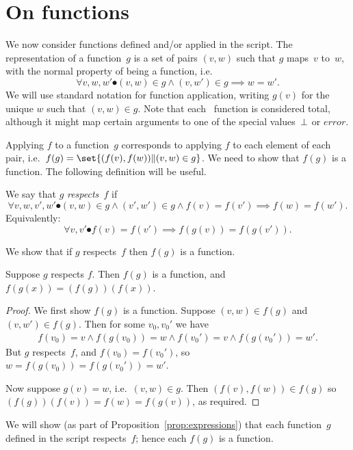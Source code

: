 \section{On functions}
\label{sec:functions}

We now consider functions defined and/or applied in the script.
The representation of a function~$g$ is a set of pairs $(v,w)$ such that $g$
maps~$v$ to~$w$, with the normal property of being a function, i.e.
\[
\forall v, w, w' \spot (v,w) \in g \land (v,w') \in g \implies w=w'.
\]
We will use standard notation for function application, writing $g(v)$ for the
unique $w$ such that $(v,w) \in g$.
%
Note that each \CSPm\ function is considered total, although it might map
certain arguments to one of the special values~$\perp$ or $error$. 

Applying $f$ to a function~$g$ corresponds to applying $f$ to each element of
each pair, i.e.~$f(g) = \set{(f(v), f(w)) \| (v,w) \in g}$.  We need to show
that $f(g)$ is a function. 
%
The following definition will be useful.
%
\begin{definition}
We say that $g$ \emph{respects~$f$} if
\[
\forall v, w, v', w' \spot 
  (v,w) \in g \land (v',w') \in g \land f(v) = f(v') \implies f(w) = f(w'). 
\]
Equivalently:
\[
\forall v,  v' \spot f(v) = f(v') \implies f(g(v)) = f(g(v')). 
\]
\end{definition}

We show that if $g$ respects~$f$ then $f(g)$ is a function.  
%
\begin{lemma}
\label{lem:function-respects}
Suppose $g$ respects $f$.  Then $f(g)$ is a function, and $f(g(x)) =
(f(g))(f(x))$.
\end{lemma}
%
\begin{proof}
We first show $f(g)$ is a function.  Suppose $(v,w) \in f(g)$ and $(v,w') \in
f(g)$.  Then for some $v_0, v_0'$ we have
\[
\begin{align}
f(v_0) = v \land f(g(v_0)) = w \land 
f(v_0') = v \land f(g(v_0')) = w'.
\end{align}
\]
But $g$ respects~$f$, and $f(v_0) = f(v_0')$, so $w = f(g(v_0)) = f(g(v_0')) =
w'$.

Now suppose $g(v) = w$, i.e.~$(v,w) \in g$.  Then $(f(v),f(w)) \in f(g)$ so
$(f(g))(f(v)) = f(w) = f(g(v))$, as required.
\end{proof}

We will show (as part of Proposition~\ref{prop:expressions}) that each
function~$g$ defined in the script respects~$f$; hence each $f(g)$ is a
function.
